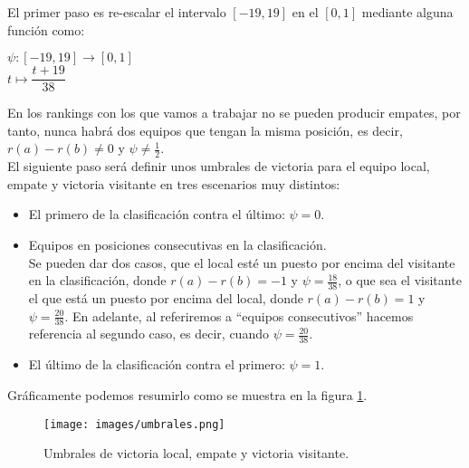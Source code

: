 \newpage

El primer paso es re-escalar el intervalo $[-19,19]$ en el $[0,1]$ mediante alguna función como:
\begin{center}
	$ \psi: [-19,19] \longrightarrow [0,1]$\\
	$ t \longmapsto \dfrac{t+19}{38}$
\end{center}

En los rankings con los que vamos a trabajar no se pueden producir empates, por tanto, nunca habrá dos equipos que tengan la misma posición, es decir, $r(a)-r(b)\neq 0$ y $\psi \neq \frac{1}{2}$.\\

El siguiente paso será definir unos umbrales de victoria para el equipo local, empate y victoria visitante en tres escenarios muy distintos:
\begin{itemize}
	\item El primero de la clasificación contra el último: $\psi = 0$.
	\item Equipos en posiciones consecutivas en la clasificación. \\
	Se pueden dar dos casos, que el local esté un puesto por encima del visitante en la clasificación, donde $r(a)-r(b) = -1$ y $\psi = \frac{18}{38}$, o que sea el visitante el que está un puesto por encima del local, donde $r(a)-r(b)=1$ y $\psi = \frac{20}{38}$. En adelante, al referiremos a ``equipos consecutivos'' hacemos referencia al segundo caso, es decir, cuando $\psi=\frac{20}{38}$.
	\item El último de la clasificación contra el primero: $\psi = 1$.
\end{itemize}

Gráficamente podemos resumirlo como se muestra en la figura \ref{fig:umbrales}.

\begin{figure}[H]
		\centering
		\texttt{[image: images/umbrales.png]}
		\caption{Umbrales de victoria local, empate y victoria visitante.} \label{fig:umbrales}
\end{figure}

